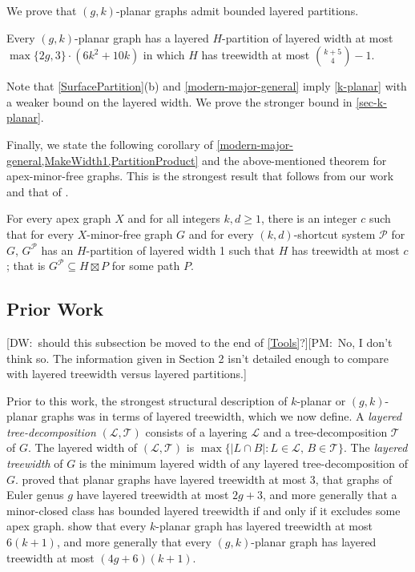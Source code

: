 \documentclass{patmorin}
\newcommand{\note}[2]{{\color{red}[#1:~#2]}}
\newcommand{\PP}{\mathcal{P}}
\renewcommand{\geq}{\geqslant}
\begin{document}
We prove that $(g,k)$-planar graphs admit bounded layered partitions. 

\begin{thm}
\label{g-k-planar}
Every $(g,k)$-planar graph has a layered $H$-partition of layered width at most 
$\max\{2g,3\}\cdot(6k^2 + 10k)$ in which $H$ has treewidth at most $\binom{k+5}{4}-1$.
\end{thm}

Note that \cref{SurfacePartition}(b) and \cref{modern-major-general} imply \cref{k-planar} with a weaker bound on the layered width. We prove the stronger bound in \cref{sec-k-planar}. 

Finally, we state the following corollary of \cref{modern-major-general,MakeWidth1,PartitionProduct} and the above-mentioned theorem for apex-minor-free graphs.  This is the strongest result that follows from our work and that of \citet{dujmovic.joret.ea:planar}. 

\begin{thm}
For every apex graph $X$ and for all integers $k,d\geq 1$, there is an integer $c$ such that for every $X$-minor-free graph $G$ and for every $(k,d)$-shortcut system $\PP$ for $G$,  $G^\PP$ has an $H$-partition of layered width 1 such that $H$ has treewidth at most $c$; that is $G^\PP \subseteq H \boxtimes P$ for some path $P$. 
\end{thm}

\subsection{Prior Work}
\label{PriorWork}

\note{DW}{should this subsection be moved to the end of \cref{Tools}?}\note{PM}{No, I don't think so. The information given in Section 2 isn't detailed enough to compare with layered treewidth versus layered partitions.}

Prior to this work, the strongest structural description of $k$-planar or $(g,k)$-planar graphs was in terms of layered treewidth, which we now define.  A \emph{layered tree-decomposition} $(\mathcal{L},\mathcal{T})$ consists of a layering $\mathcal{L}$ and a tree-decomposition $\mathcal{T}$ of $G$. The layered width of $(\mathcal{L},\mathcal{T})$ is $\max\{|L\cap B|: L\in \mathcal{L},\, B\in \mathcal{T}\}$.  The \emph{layered treewidth} of $G$ is the minimum layered width of any layered tree-decomposition of $G$. \citet{dujmovic.morin.ea:layered} proved that planar graphs have layered treewidth at most 3, that graphs of Euler genus $g$ have layered treewidth at most $2g+3$, and more generally that a minor-closed class has bounded layered treewidth if and only if it excludes some apex graph. \citet{dujmovic.eppstein.ea:structure} show that every $k$-planar graph has layered treewidth at most $6(k+1)$, and more generally that 
every $(g,k)$-planar graph has layered treewidth at most $(4g+6)(k+1)$.
\end{document}
